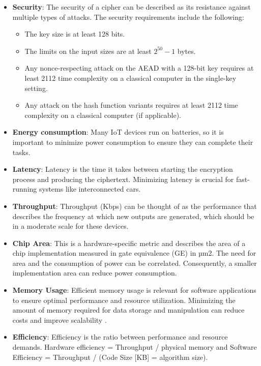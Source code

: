 \documentclass[a4paper,11pt, twoside]{article}
\begin{document}
\begin{itemize}
    \setlength{\itemsep}{-5pt}
    \item \textbf{Security}: The security of a cipher can be described as its resistance against multiple types of attacks. The security requirements include the following:
        \begin{itemize}
            \item The key size is at least 128 bits.
            \item The limits on the input sizes are at least $2^{50} - 1$ bytes.
            \item Any nonce-respecting attack on the AEAD with a 128-bit key requires at least 2112 time complexity on a classical computer in the single-key setting.
            \item Any attack on the hash function variants requires at least 2112 time complexity on a classical computer (if applicable).
        \end{itemize}
    \item \textbf{Energy consumption}: Many IoT devices run on batteries, so it is important to minimize power consumption to ensure they can complete their tasks.
    \item \textbf{Latency}: Latency is the time it takes between starting the encryption process and producing the ciphertext. Minimizing latency is crucial for fast-running systems like interconnected cars.
    \item \textbf{Throughput}: Throughput (Kbps) can be thought of as the performance that describes the frequency at which new outputs are generated, which should be in a moderate scale for these devices.
    \item \textbf{Chip Area}: This is a hardware-specific metric and describes the area of a chip implementation measured in gate equivalence (GE) in µm2. The need for area and the consumption of power can be correlated. Consequently, a smaller implementation area can reduce power consumption.
    \item \textbf{Memory Usage}: Efficient memory usage is relevant for software applications to ensure optimal performance and resource utilization. Minimizing the amount of memory required for data storage and manipulation can reduce costs and improve scalability \cite{mckay2016report}.
    \item \textbf{Efficiency}: Efficiency is the ratio between performance and resource demands. Hardware efficiency = Throughput / physical memory and Software Efficiency = Throughput / (Code Size [KB] = algorithm size).
\end{itemize}
\end{document}
